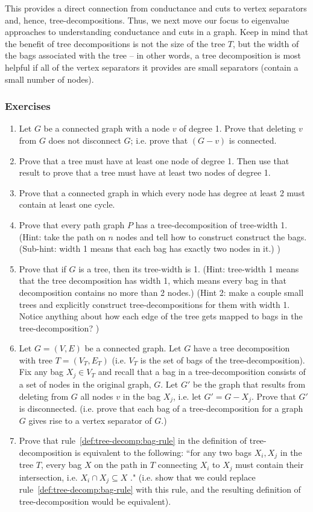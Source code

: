 This provides a direct connection from conductance and cuts to vertex separators and, hence, tree-decompositions.
Thus, we next move our focus to eigenvalue approaches to understanding conductance and cuts in a graph.
Keep in mind that the benefit of tree decompositions is not the size of the tree $T$, but the width of the bags associated with the tree -- in other words, a tree decomposition is most helpful if all of the vertex separators it provides are small separators (contain a small number of nodes).


\subsubsection{Exercises}\label{sec:tree-decomposition:exercises}

\begin{enumerate}[label=\ref{sec:tree-decomposition}.\arabic*]
\item Let $G$ be a connected graph with a node $v$ of degree 1. Prove that deleting $v$ from $G$ does not disconnect $G$; i.e. prove that $(G-v)$ is connected.
\item Prove that a tree must have at least one node of degree 1. Then use that result to prove that a tree must have at least two nodes of degree 1.
\item Prove that a connected graph in which every node has degree at least 2 must contain at least one cycle.
\item Prove that every path graph $P$ has a tree-decomposition of tree-width 1. (Hint: take the path on $n$ nodes and tell how to construct construct the bags. (Sub-hint: width 1 means that each bag has exactly two nodes in it.) )
  \item Prove that if $G$ is a tree, then its tree-width is 1. (Hint: tree-width 1 means that the tree decomposition has width 1, which means every bag in that decomposition contains no more than 2 nodes.) (Hint 2: make a couple small trees and explicitly construct tree-decompositions for them with width 1. Notice anything about how each edge of the tree gets mapped to bags in the tree-decomposition? )
  \item Let $G = (V,E)$ be a connected graph. Let $G$ have a tree decomposition with tree $T=(V_T,E_T)$ (i.e. $V_T$ is the set of bags of the tree-decomposition).
  Fix any bag $X_j \in V_T$ and recall that a bag in a tree-decomposition consists of a set of nodes in the original graph, $G$.
  Let $G'$ be the graph that results from deleting from $G$ all nodes $v$ in the bag $X_j$, i.e. let $G' = G-X_j$.
  Prove that $G'$ is disconnected.
  (i.e. prove that each bag of a tree-decomposition for a graph $G$ gives rise to a vertex separator of $G$.)

  \item Prove that rule~\ref{def:tree-decomp:bag-rule} in the definition of tree-decomposition is equivalent to the following: ``for any two bags $X_i, X_j$ in the tree $T$, every bag $X$ on the path in $T$ connecting $X_i$ to $X_j$ must contain their intersection, i.e. $X_i \cap X_j \subseteq X$ ." (i.e. show that we could replace rule~\ref{def:tree-decomp:bag-rule} with this rule, and the resulting definition of tree-decomposition would be equivalent).
\end{enumerate}
